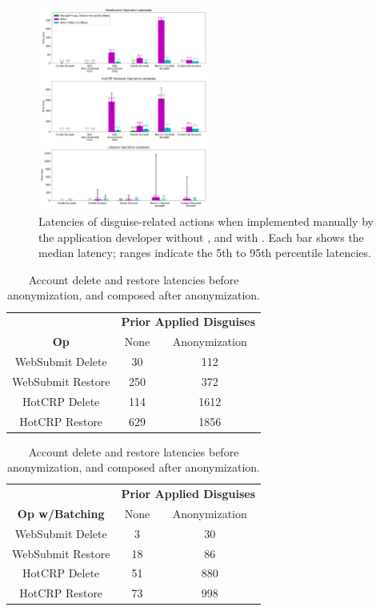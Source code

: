  \begin{figure}[h!] 
    \centering
    \includegraphics[width=0.5\textwidth]{figs/client_op_stats} 
    \caption{Latencies of disguise-related actions when implemented manually by the 
    application developer without \sys, and with \sys.  
    Each bar shows the median latency; ranges indicate the 5th to 95th
    percentile latencies.  } 
    \label{fig:client_opstats}
\end{figure}

\begin{table}[t!]
\begin{center}
\begin{tabular}{ c | c c }
& \multicolumn{2}{c}{\textbf{Prior Applied Disguises}} \\
    \textbf{Op} & None & Anonymization \\
\hline
WebSubmit Delete & 30 & 112 \\
WebSubmit Restore & 250 & 372\\
HotCRP Delete & 114 & 1612 \\
HotCRP Restore & 629 & 1856 \\
\end{tabular}
\quad
\begin{tabular}{ c | c c }
 & \multicolumn{2}{c}{\textbf{Prior Applied Disguises}} \\
    \textbf{Op w/Batching} & None & Anonymization \\
\hline
WebSubmit Delete  & 3 & 30 \\
WebSubmit Restore  & 18 & 86\\
HotCRP Delete  & 51 & 880 \\
HotCRP Restore  & 73 & 998 
\end{tabular}
\end{center}
\caption{Account delete and restore latencies before anonymization, and composed after anonymization.}
\label{tab:composition}
\end{table}

